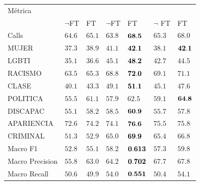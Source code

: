 \begin{table}
    \centering
    \Large
    \begin{tabular}{l P{0.08\textwidth}P{0.08\textwidth} P{0.08\textwidth}P{0.08\textwidth}  P{0.08\textwidth}P{0.08\textwidth}}
        Métrica        &&           &      \\
                       & $\neg$FT&    FT    & $\neg$FT   &    FT     & $\neg$ FT&    FT     \\
        \hline
        Calls          & $64.6$ &    $65.1$   & $63.8$ &$\mathbf{68.5}$  & $65.3$ &    $68.0$    \\
        MUJER          & $37.3$ &    $38.9$   & $41.1$ &$\mathbf{42.1}$  & $38.1$ &$\mathbf{42.1}$ \\
        LGBTI          & $35.1$ &    $36.6$   & $45.1$ &$\mathbf{48.2}$  & $42.7$ &    $44.5$    \\
        RACISMO        & $63.5$ &    $65.3$   & $68.8$ &$\mathbf{72.0}$  & $69.1$ &    $71.1$    \\
        CLASE          & $40.1$ &    $43.3$   & $49.1$ &$\mathbf{51.1}$  & $45.1$ &    $47.6$    \\
        POLITICA       & $55.5$ &    $61.1$   & $57.9$ &$62.5$        & $59.1$ &$\mathbf{64.8}$ \\
        DISCAPAC       & $55.1$ &    $58.2$   & $58.5$ &$\mathbf{60.9}$  & $55.7$ &    $57.8$    \\
        APARIENCIA     & $72.6$ &    $74.2$   & $74.1$ &$\mathbf{76.6}$  & $75.5$ &    $75.8$    \\
        CRIMINAL       & $51.3$ &    $52.9$   & $65.0$ &$\mathbf{69.9}$  & $65.4$ &    $66.8$    \\
        \hline
        Macro F1       & $52.8$ &    $55.1$   & $58.2$ &$\mathbf{0.613}$ & $57.3$ &    $59.8$    \\
        Macro Precision& $55.8$ &    $63.0$   & $64.2$ &$\mathbf{0.702}$ & $67.7$ &    $67.8$    \\
        Macro Recall   & $50.6$ &    $49.9$   & $54.0$ &$\mathbf{0.551}$ & $50.4$ &    $54.1$    \\

\end{tabular}
\end{table}
